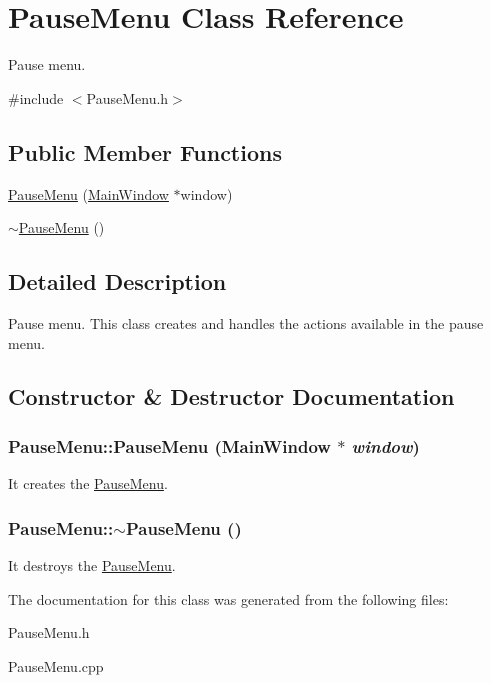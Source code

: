 \hypertarget{classPauseMenu}{
\section{PauseMenu Class Reference}
\label{classPauseMenu}
}


Pause menu.  


{\ttfamily \#include $<$PauseMenu.h$>$}\subsection*{Public Member Functions}
\begin{DoxyCompactItemize}
\item 
\hyperlink{classPauseMenu_aa3760a6c665b7240fb2d5eea86e39fb0}{PauseMenu} (\hyperlink{classMainWindow}{MainWindow} $\ast$window)
\item 
\hyperlink{classPauseMenu_af30f0b8f5f59c6779434295a731b0e35}{$\sim$PauseMenu} ()
\end{DoxyCompactItemize}


\subsection{Detailed Description}
Pause menu. This class creates and handles the actions available in the pause menu. 

\subsection{Constructor \& Destructor Documentation}
\hypertarget{classPauseMenu_aa3760a6c665b7240fb2d5eea86e39fb0}{
\subsubsection[{PauseMenu}]{\setlength{\rightskip}{0pt plus 5cm}PauseMenu::PauseMenu ({\bf MainWindow} $\ast$ {\em window})}}
\label{classPauseMenu_aa3760a6c665b7240fb2d5eea86e39fb0}
It creates the \hyperlink{classPauseMenu}{PauseMenu}. \hypertarget{classPauseMenu_af30f0b8f5f59c6779434295a731b0e35}{
\subsubsection[{$\sim$PauseMenu}]{\setlength{\rightskip}{0pt plus 5cm}PauseMenu::$\sim$PauseMenu ()}}
\label{classPauseMenu_af30f0b8f5f59c6779434295a731b0e35}
It destroys the \hyperlink{classPauseMenu}{PauseMenu}. 

The documentation for this class was generated from the following files:\begin{DoxyCompactItemize}
\item 
PauseMenu.h\item 
PauseMenu.cpp\end{DoxyCompactItemize}
